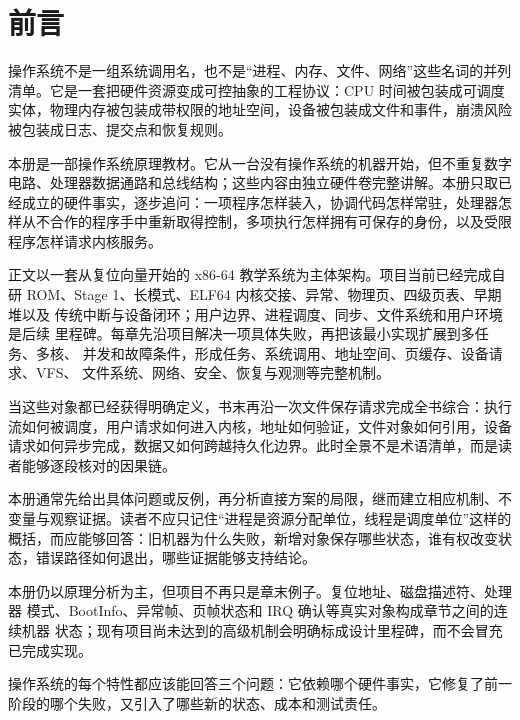\chapter*{前言}

操作系统不是一组系统调用名，也不是“进程、内存、文件、网络”这些名词的并列清单。它是一套把硬件资源变成可控抽象的工程协议：CPU 时间被包装成可调度实体，物理内存被包装成带权限的地址空间，设备被包装成文件和事件，崩溃风险被包装成日志、提交点和恢复规则。

本册是一部操作系统原理教材。它从一台没有操作系统的机器开始，但不重复数字电路、处理器数据通路和总线结构；这些内容由独立硬件卷完整讲解。本册只取已经成立的硬件事实，逐步追问：一项程序怎样装入，协调代码怎样常驻，处理器怎样从不合作的程序手中重新取得控制，多项执行怎样拥有可保存的身份，以及受限程序怎样请求内核服务。

正文以一套从复位向量开始的 x86-64 教学系统为主体架构。项目当前已经完成自研
ROM、Stage 1、长模式、ELF64 内核交接、异常、物理页、四级页表、早期堆以及
传统中断与设备闭环；用户边界、进程调度、同步、文件系统和用户环境是后续
里程碑。每章先沿项目解决一项具体失败，再把该最小实现扩展到多任务、多核、
并发和故障条件，形成任务、系统调用、地址空间、页缓存、设备请求、VFS、
文件系统、网络、安全、恢复与观测等完整机制。

当这些对象都已经获得明确定义，书末再沿一次文件保存请求完成全书综合：执行流如何被调度，用户请求如何进入内核，地址如何验证，文件对象如何引用，设备请求如何异步完成，数据又如何跨越持久化边界。此时全景不是术语清单，而是读者能够逐段核对的因果链。

本册通常先给出具体问题或反例，再分析直接方案的局限，继而建立相应机制、不变量与观察证据。读者不应只记住“进程是资源分配单位，线程是调度单位”这样的概括，而应能够回答：旧机器为什么失败，新增对象保存哪些状态，谁有权改变状态，错误路径如何退出，哪些证据能够支持结论。

本册仍以原理分析为主，但项目不再只是章末例子。复位地址、磁盘描述符、处理器
模式、BootInfo、异常帧、页帧状态和 IRQ 确认等真实对象构成章节之间的连续机器
状态；现有项目尚未达到的高级机制会明确标成设计里程碑，而不会冒充已完成实现。

\begin{keyidea}
操作系统的每个特性都应该能回答三个问题：它依赖哪个硬件事实，它修复了前一阶段的哪个失败，又引入了哪些新的状态、成本和测试责任。
\end{keyidea}
